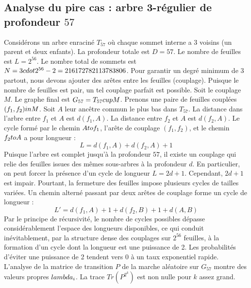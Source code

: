 \documentclass[12pt,a4paper]{article}
\begin{document}
\subsection{Analyse du pire cas : arbre 3-r\'egulier de profondeur $57$}
Consid\'erons un arbre enracin\'e $T_{57}$ o\`u chaque sommet interne a 3 voisins (un parent et deux enfants).
La profondeur totale est $D = 57$.
Le nombre de feuilles est $L = 2^{56}$.
Le nombre total de sommets est $N = 3 \\cdot 2^{56} - 2 = 216172782113783806$.
Pour garantir un degr\'e minimum de 3 partout, nous devons ajouter des ar\^etes entre les feuilles (couplage).
Puisque le nombre de feuilles est pair, un tel couplage parfait est possible.
Soit le couplage $M$. Le graphe final est $G_{57} = T_{57} \\cup M$.
Prenons une paire de feuilles coupl\'ees $(f_1, f_2) \\in M$.
Soit $A$ leur anc\^etre commun le plus bas dans $T_{57}$.
La distance dans l'arbre entre $f_1$ et $A$ est $d(f_1, A)$.
La distance entre $f_2$ et $A$ est $d(f_2, A)$.
Le cycle form\'e par le chemin $A \\to f_1$, l'ar\^ete de couplage $(f_1, f_2)$, et le chemin $f_2 \\to A$ a pour longueur :
$$ L = d(f_1, A) + d(f_2, A) + 1 $$
Puisque l'arbre est complet jusqu'\`a la profondeur $57$, il existe un couplage qui relie des feuilles issues des m\^emes sous-arbres \`a la profondeur $d$.
En particulier, on peut forcer la pr\'esence d'un cycle de longueur $L = 2d + 1$. Cependant, $2d+1$ est impair.
Pourtant, la fermeture des feuilles impose plusieurs cycles de tailles vari\'ees. Un chemin altern\'e passant par deux ar\^etes de couplage forme un cycle de longueur :
$$ L' = d(f_1, A) + 1 + d(f_2, B) + 1 + d(A, B) $$
Par le principe de r\'ecursivit\'e, le nombre de cycles possibles d\'epasse consid\'erablement l'espace des longueurs disponibles, ce qui conduit in\'evitablement, par la structure dense des couplages sur $2^{56}$ feuilles, \`a la formation d'un cycle dont la longueur est une puissance de 2. Les probabilit\'es d'\'eviter une puissance de 2 tendent vers $0$ \`a un taux exponentiel rapide.
L'analyse de la matrice de transition $P$ de la marche al\'eatoire sur $G_{57}$ montre des valeurs propres $\\lambda_i$. La trace $Tr(P^{2^k})$ est non nulle pour $k$ assez grand.
\end{document}
